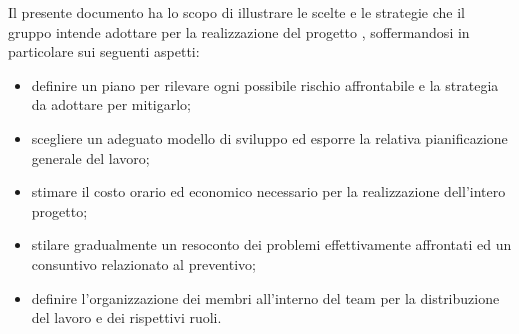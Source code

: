 Il presente documento ha lo scopo di illustrare le scelte e le strategie che il gruppo \Gruppo{} intende adottare per la realizzazione del progetto \NomeProgetto{}, soffermandosi in particolare sui seguenti aspetti:
    \begin{itemize}
        \item definire un piano per rilevare ogni possibile rischio affrontabile e la strategia da adottare per mitigarlo;
        \item scegliere un adeguato modello di sviluppo ed esporre la relativa pianificazione generale del lavoro;
        \item stimare il costo orario ed economico necessario per la realizzazione dell'intero progetto;
        \item stilare gradualmente un resoconto dei problemi effettivamente affrontati ed un consuntivo relazionato al preventivo;
        \item definire l'organizzazione dei membri all'interno del team per la distribuzione del lavoro e dei rispettivi ruoli.
    \end{itemize}